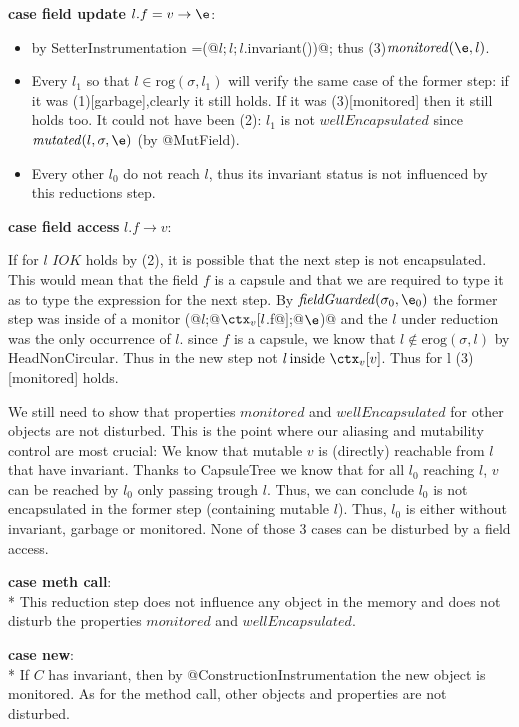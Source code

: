 \noindent\textbf{case field update} $l.f=v\rightarrow \e$:
  \begin{itemize}
  \item by SetterInstrumentation 
  \e=\Q@M(@$l;l;l$\Q@.invariant())@;
  thus (3)$\mathit{monitored}(\e,l)$.
  \item Every $l_1$ so that $l\in \text{rog}(\sigma,l_1)$ will verify the same case
  of the former step:
  if it was (1)[garbage],clearly it still holds.
  If it was (3)[monitored] then it still holds too.
  It could not have been (2): $l_1$ is not $\mathit{wellEncapsulated}$ since 
$\mathit{mutated}(l,	\sigma,\e)$ (by @MutField).
  \item Every other $l_0$ do not reach $l$, thus its invariant status is not
 influenced by this reductions step.
\end{itemize}

\noindent\textbf{case field access} $l.f\rightarrow v$:

    If for $l$ $IOK$ holds by (2),  
    it is possible that the next step is not encapsulated.
    This would mean that the field $f$ is a capsule and that we are required
to type it as \Q@mut@ to type the expression for the next step.
By $\mathit{fieldGuarded}(\sigma_0,\e_0)$
    the former step was inside of a monitor \Q@M(@$l$\Q@;@$\ctx_v[l$\Q@.f@$]$\Q@;@$\e$\Q@)@
    and the $l$ under reduction was the only occurrence of $l$.
    since $f$ is a capsule, we know that $l\notin \text{erog}(\sigma,l)$
    by HeadNonCircular.
    Thus in the new step not $l\, \text{inside}\ \ctx_v[v]$.
    Thus for l (3)[monitored] holds.
    
We still need to show that properties $\mathit{monitored}$ and $\mathit{wellEncapsulated}$
 for other objects are
not disturbed. This is the point where our aliasing and mutability control are most crucial:
We know that mutable $v$ is (directly) reachable from
$l$ that have invariant.
Thanks to CapsuleTree we know that for all $l_0$ reaching $l$,
$v$ can be reached by $l_0$ only passing trough $l$.
Thus, we can conclude  $l_0$ is not encapsulated in the former step (containing mutable $l$).
Thus, $l_0$ is either without invariant, garbage or monitored.
None of those 3 cases can be disturbed by a field access.


\noindent\textbf{case meth call}:\\*
  This reduction step does not influence any object in the memory and does not
disturb the properties $\mathit{monitored}$ and $\mathit{wellEncapsulated}$.

\noindent\textbf{case new}:\\*
  If $C$ has invariant, then by @ConstructionInstrumentation the new object is monitored.
As for the method call, other objects and properties are not disturbed.


